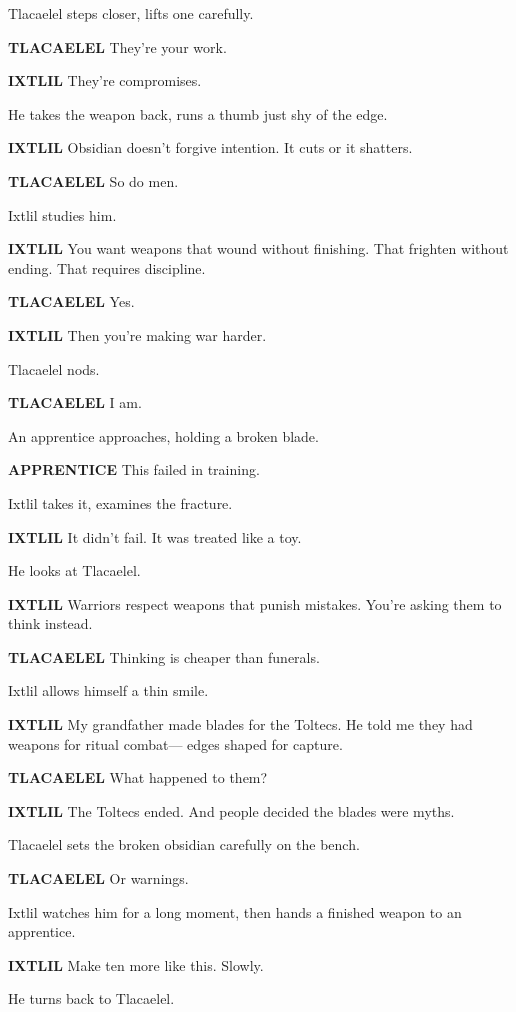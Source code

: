 \documentclass[12pt]{article}
\begin{document}
Tlacaelel steps closer, lifts one carefully.

\textbf{TLACAELEL}  
They’re your work.

\textbf{IXTLIL}  
They’re compromises.

He takes the weapon back, runs a thumb just shy of the edge.

\textbf{IXTLIL}  
Obsidian doesn’t forgive intention.  
It cuts or it shatters.

\textbf{TLACAELEL}  
So do men.

Ixtlil studies him.

\textbf{IXTLIL}  
You want weapons that wound without finishing.  
That frighten without ending.  
That requires discipline.

\textbf{TLACAELEL}  
Yes.

\textbf{IXTLIL}  
Then you’re making war harder.

Tlacaelel nods.

\textbf{TLACAELEL}  
I am.

An apprentice approaches, holding a broken blade.

\textbf{APPRENTICE}  
This failed in training.

Ixtlil takes it, examines the fracture.

\textbf{IXTLIL}  
It didn’t fail.  
It was treated like a toy.

He looks at Tlacaelel.

\textbf{IXTLIL}  
Warriors respect weapons that punish mistakes.  
You’re asking them to think instead.

\textbf{TLACAELEL}  
Thinking is cheaper than funerals.

Ixtlil allows himself a thin smile.

\textbf{IXTLIL}  
My grandfather made blades for the Toltecs.  
He told me they had weapons for ritual combat—  
edges shaped for capture.

\textbf{TLACAELEL}  
What happened to them?

\textbf{IXTLIL}  
The Toltecs ended.  
And people decided the blades were myths.

Tlacaelel sets the broken obsidian carefully on the bench.

\textbf{TLACAELEL}  
Or warnings.

Ixtlil watches him for a long moment, then hands a finished weapon to an apprentice.

\textbf{IXTLIL}  
Make ten more like this.  
Slowly.

He turns back to Tlacaelel.
\end{document}
